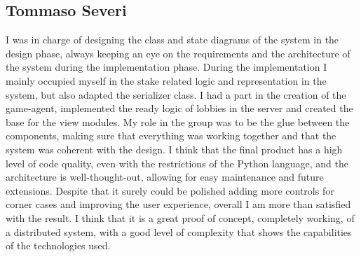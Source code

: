 \documentclass{scrartcl}
\begin{document}
\subsection{Tommaso Severi}\label{tommaso-severi}
I was in charge of designing the class and state diagrams of the system in the design phase, always
keeping an eye on the requirements and the architecture of the system during the implementation phase.
During the implementation I mainly occupied myself in the stake related logic and representation in the 
system, but also adapted the serializer class. I had a part in the creation of the game-agent,
implemented the ready logic of lobbies in the server and created the base for the view modules.
My role in the group was to be the glue between the components, making sure that everything
was working together and that the system was coherent with the design.
I think that the final product has a high level of code quality, even with the restrictions of the
Python language, and the architecture is well-thought-out, allowing for easy maintenance and
future extensions. Despite that it surely could be polished adding more controls for corner 
cases and improving the user experience, overall I am more than satisfied with the result. I think 
that it is a great proof of concept, completely working, of a distributed system, with a good level of
complexity that shows the capabilities of the technologies used.



\cite{adams1995hitchhiker} %
\end{document}
